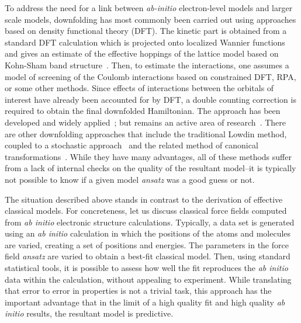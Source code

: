 To address the need for a link between {\it ab-initio} electron-level models and larger scale models, downfolding has most commonly been carried out using approaches based on density functional theory (DFT). 
The kinetic part is obtained from a standard DFT calculation which is projected onto localized Wannier functions and gives an estimate of the effective hoppings of the lattice model based on Kohn-Sham band structure~\cite{Pavirini}. 
Then, to estimate the interactions, one assumes a model of screening of the Coulomb interactions based on constrained DFT, RPA, or some other methods. 
Since effects of interactions between the orbitals of interest have already been accounted for by DFT, a double counting correction is required to obtain the final downfolded Hamiltonian. 
The approach has been developed and widely applied~\cite{}; but remains an active area of research~\cite{Haule_doublecounting}.
There are other downfolding approaches that include the traditional Lowdin method, coupled to a stochastic approach~\cite{Tenno,Zhou_Ceperley} and the related method of canonical transformations~\cite{White_CT, Yanai_CT}. 
While they have many advantages, all of these methods suffer from a lack of internal checks on the quality of the resultant model--it is typically not possible to know if a given model {\it ansatz} was a good guess or not.   

The situation described above stands in contrast to the derivation of effective classical models. 
For concreteness, let us discuss classical force fields computed from {\it ab initio} electronic structure calculations. 
Typically, a data set is generated using an {\it ab initio} calculation in which the positions of the atoms and molecules are varied, creating a set of positions and energies. 
The parameters in the force field {\it ansatz} are varied to obtain a best-fit classical model.
Then, using standard statistical tools, it is possible to assess how well the fit reproduces the {\it ab initio} data within the calculation, without appealing to experiment. 
While translating that error to error in properties is not a trivial task, this approach has the important advantage that in the limit of a high quality fit and high quality {\it ab initio} results, the resultant model is predictive.

